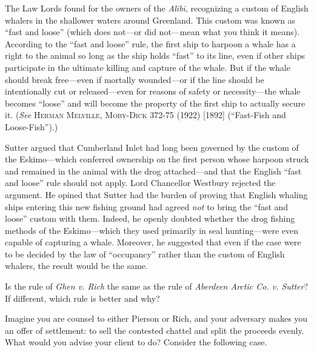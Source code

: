 The Law Lords found for the owners of the \textit{Alibi}, recognizing a custom
of English whalers in the shallower waters around Greenland. This custom was
known as ``fast and loose'' (which does not---or did not---mean what you think
it means). According to the ``fast and loose'' rule, the first ship to harpoon a
whale has a right to the animal so long as the ship holds ``fast'' to its line,
even if other ships participate in the ultimate killing and capture of the
whale. But if the whale should break free---even if mortally wounded---or if the
line should be intentionally cut or released---even for reasons of safety or
necessity---the whale becomes ``loose'' and will become the property of the
first ship to actually secure it. (\textit{See} \textsc{Herman Melville,
Moby-Dick} 372-75 (1922) [1892] (``Fast-Fish and Loose-Fish'').)

Sutter argued that Cumberland Inlet had long been governed by the custom of the
Eskimo---which conferred ownership on the first person whose harpoon struck and
remained in the animal with the drog attached---and that the English ``fast and
loose'' rule should not apply. Lord Chancellor Westbury rejected the argument.
He opined that Sutter had the burden of proving that English whaling ships
entering this new fishing ground had agreed \textit{not} to bring the ``fast and
loose'' custom with them. Indeed, he openly doubted whether the drog fishing
methods of the Eskimo---which they used primarily in seal hunting---were even
capable of capturing a whale. Moreover, he suggested that even if the case were
to be decided by the law of ``occupancy'' rather than the custom of English
whalers, the result would be the same.

Is the rule of \textit{Ghen v. Rich} the same as the rule of \textit{Aberdeen
Arctic Co. v. Sutter}? If different, which rule is better and why?


\item \label{bkm:Ref302291448}Imagine you are counsel to either Pierson or Rich,
and your adversary makes you an offer of settlement: to sell the contested
chattel and split the proceeds evenly. What would you advise your client to do?
Consider the following case.



